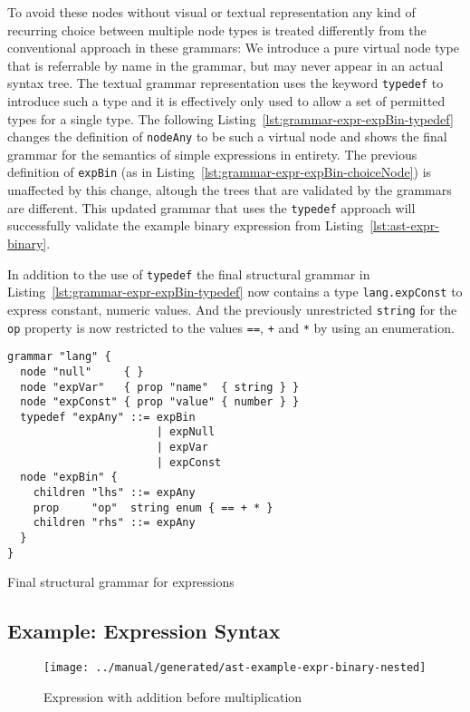 \documentclass[sigconf,natbib=false,review=true,anonymous]{acmart}
\newcommand\astScale{0.7}
\begin{document}
To avoid these nodes without visual or textual representation any kind of recurring choice between multiple node types is treated differently from the conventional approach in these grammars: We introduce a pure virtual node type that is referrable by name in the grammar, but may never appear in an actual syntax tree. The textual grammar representation uses the keyword \texttt{typedef} to introduce such a type and it is effectively only used to allow a set of permitted types for a single type. The following Listing~\ref{lst:grammar-expr-expBin-typedef} changes the definition of \texttt{nodeAny} to be such a virtual node and shows the final grammar for the semantics of simple expressions in entirety. The previous definition of \texttt{expBin} (as in Listing~\ref{lst:grammar-expr-expBin-choiceNode}) is unaffected by this change, altough the trees that are validated by the grammars are different. This updated grammar that uses the \texttt{typedef} approach will successfully validate the example binary expression from Listing~\ref{lst:ast-expr-binary}.

In addition to the use of \texttt{typedef} the final structural grammar in Listing~\ref{lst:grammar-expr-expBin-typedef} now contains a type \texttt{lang.expConst} to express constant, numeric values. And the previously unrestricted \texttt{string} for the \texttt{op} property is now restricted to the values \texttt{==}, \texttt{+} and \texttt{*} by using an enumeration.

\begin{listing}
\begin{verbatim}
grammar "lang" {
  node "null"     { }
  node "expVar"   { prop "name"  { string } }
  node "expConst" { prop "value" { number } }
  typedef "expAny" ::= expBin
                       | expNull
                       | expVar
                       | expConst
  node "expBin" {
    children "lhs" ::= expAny
    prop     "op"  string enum { == + * }
    children "rhs" ::= expAny
  }
}
\end{verbatim}

\caption{Final structural grammar for expressions}
\label{lst:grammar-expr-expBin-typedef}
\end{listing}

\subsection{Example: Expression Syntax}

\begin{figure}
  \texttt{[image: ../manual/generated/ast-example-expr-binary-nested]}
  \caption{Expression with addition before multiplication}
  \label{fig:ast-nested-ambiguous}
\end{figure}
\end{document}
